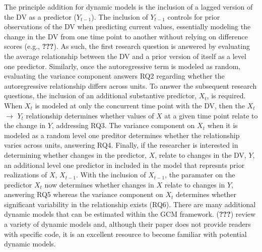 \documentclass[english,,man]{apa6}
\begin{document}
The principle addition for dynamic models is the inclusion of a lagged version of the DV as a predictor (\(Y_{t-1}\)). The inclusion of \(Y_{t-1}\) controls for prior observations of the DV when predicting current values, essentially modeling the change in the DV from one time point to another without relying on difference scores (e.g., {\textbf{???}}). As such, the first research question is answered by evaluating the average relationship between the DV and a prior version of itself as a level one predictor. Similarly, once the autoregressive term is modeled as random, evaluating the variance component answers RQ2 regarding whether the autoregressive relationship differs across units. To answer the subsequent research questions, the inclusion of an additional substantive predictor, \(X_t\), is required. When \(X_t\) is modeled at only the concurrent time point with the DV, then the \(X_t\) \(\rightarrow\) \(Y_t\) relationship determines whether values of \(X\) at a given time point relate to the change in \(Y\), addressing RQ3. The variance component on \(X_t\) when it is modeled as a random level one preditor determines whether the relationship varies across units, answering RQ4. Finally, if the researcher is interested in determining whether changes in the predictor, \(X\), relate to changes in the DV, \(Y\), an additional level one predictor in included in the model that represnts prior realizations of \(X\), \(X_{t-1}\). With the inclusion of \(X_{t-1}\), the paramater on the predictor \(X_t\) now determines whether changes in \(X\) relate to changes in \(Y\), answering RQ5 whereas the variance component on \(X_t\) determines whether significant variability in the relationship exists (RQ6). There are many additional dynamic models that can be estimated within the GCM framework. ({\textbf{???}}) review a variety of dynamic models and, although their paper does not provide readers with specific code, it is an excellent resource to become familiar with potential dynamic models.
\end{document}
